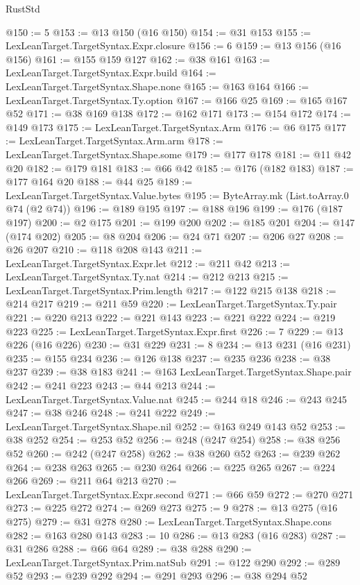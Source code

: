\begin{lexlean}{RustStd}
\begin{coremodule}
@150 := 5
@153 := @13 @150 (@16 @150)
@154 := @31 @153
@155 := LexLeanTarget.TargetSyntax.Expr.closure
@156 := 6
@159 := @13 @156 (@16 @156)
@161 := @155 @159 @127
@162 := @38 @161
@163 := LexLeanTarget.TargetSyntax.Expr.build
@164 := LexLeanTarget.TargetSyntax.Shape.none
@165 := @163 @164
@166 := LexLeanTarget.TargetSyntax.Ty.option
@167 := @166 @25
@169 := @165 @167 @52
@171 := @38 @169 @138
@172 := @162 @171
@173 := @154 @172
@174 := @149 @173
@175 := LexLeanTarget.TargetSyntax.Arm
@176 := @6 @175
@177 := LexLeanTarget.TargetSyntax.Arm.arm
@178 := LexLeanTarget.TargetSyntax.Shape.some
@179 := @177 @178
@181 := @11 @42 @20
@182 := @179 @181
@183 := @66 @42
@185 := @176 (@182 @183)
@187 := @177 @164 @20
@188 := @44 @25
@189 := LexLeanTarget.TargetSyntax.Value.bytes
@195 := ByteArray.mk (List.toArray.{0} @74 (@2 @74))
@196 := @189 @195
@197 := @188 @196
@199 := @176 (@187 @197)
@200 := @2 @175
@201 := @199 @200
@202 := @185 @201
@204 := @147 (@174 @202)
@205 := @8 @204
@206 := @24 @71
@207 := @206 @27
@208 := @26 @207
@210 := @118 @208 @143
@211 := LexLeanTarget.TargetSyntax.Expr.let
@212 := @211 @42
@213 := LexLeanTarget.TargetSyntax.Ty.nat
@214 := @212 @213
@215 := LexLeanTarget.TargetSyntax.Prim.length
@217 := @122 @215 @138
@218 := @214 @217
@219 := @211 @59
@220 := LexLeanTarget.TargetSyntax.Ty.pair
@221 := @220 @213
@222 := @221 @143
@223 := @221 @222
@224 := @219 @223
@225 := LexLeanTarget.TargetSyntax.Expr.first
@226 := 7
@229 := @13 @226 (@16 @226)
@230 := @31 @229
@231 := 8
@234 := @13 @231 (@16 @231)
@235 := @155 @234
@236 := @126 @138
@237 := @235 @236
@238 := @38 @237
@239 := @38 @183
@241 := @163 LexLeanTarget.TargetSyntax.Shape.pair
@242 := @241 @223
@243 := @44 @213
@244 := LexLeanTarget.TargetSyntax.Value.nat
@245 := @244 @18
@246 := @243 @245
@247 := @38 @246
@248 := @241 @222
@249 := LexLeanTarget.TargetSyntax.Shape.nil
@252 := @163 @249 @143 @52
@253 := @38 @252
@254 := @253 @52
@256 := @248 (@247 @254)
@258 := @38 @256 @52
@260 := @242 (@247 @258)
@262 := @38 @260 @52
@263 := @239 @262
@264 := @238 @263
@265 := @230 @264
@266 := @225 @265
@267 := @224 @266
@269 := @211 @64 @213
@270 := LexLeanTarget.TargetSyntax.Expr.second
@271 := @66 @59
@272 := @270 @271
@273 := @225 @272
@274 := @269 @273
@275 := 9
@278 := @13 @275 (@16 @275)
@279 := @31 @278
@280 := LexLeanTarget.TargetSyntax.Shape.cons
@282 := @163 @280 @143
@283 := 10
@286 := @13 @283 (@16 @283)
@287 := @31 @286
@288 := @66 @64
@289 := @38 @288
@290 := LexLeanTarget.TargetSyntax.Prim.natSub
@291 := @122 @290
@292 := @289 @52
@293 := @239 @292
@294 := @291 @293
@296 := @38 @294 @52

\end{coremodule}
\end{lexlean}

